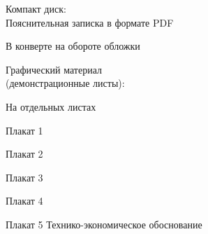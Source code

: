 


 
 
 
 
 \newpage
 \tableofcontents
 \vspace{1cm}
 \begin{minipage}[left]{0.6\linewidth}
  Компакт диск: \\
  Пояснительная записка в формате PDF
 \end{minipage}
 \hfill
 \begin{minipage}[right]{0.3\linewidth}
  В конверте на обороте обложки 
 \end{minipage}
 
 \vspace{1cm}
 
 \begin{minipage}[left]{0.6\linewidth}
  Графический материал \\ (демонстрационные листы):
 \end{minipage}
 \hfill
 \begin{minipage}[right]{0.3\linewidth}
  На отдельных листах
 \end{minipage}
 
 \vspace{1cm}
 
 Плакат 1
 
 Плакат 2
 
 Плакат 3
 
 Плакат 4
 
 Плакат 5 Технико-экономическое обоснование
 
 
 
 
 
 
 \newpage
 \renewcommand{\refname}{\hfill Список использованных источников \hfill}
 
 


